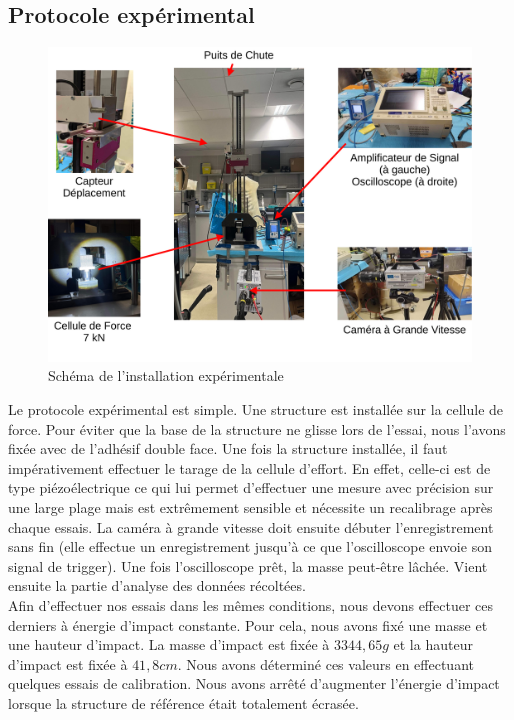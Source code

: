 \documentclass[a4paper]{article}
\begin{document}
	\subsection{Protocole expérimental}	
	\begin{figure}[H]
		\centering
		\includegraphics[width=15cm]{Images/6/protocole.pdf}
		\caption{Schéma de l'installation expérimentale}
	\end{figure}

	\hspace{0.5cm}Le protocole expérimental est simple. Une structure est installée sur la cellule de force. Pour éviter que la base de la structure ne glisse lors de l'essai, nous l'avons fixée avec de l'adhésif double face. Une fois la structure installée, il faut impérativement effectuer le tarage de la cellule d'effort. En effet, celle-ci est de type piézoélectrique ce qui lui permet d'effectuer une mesure avec précision sur une large plage mais est extrêmement sensible et nécessite un recalibrage après chaque essais. La caméra à grande vitesse doit ensuite débuter l'enregistrement sans fin (elle effectue un enregistrement jusqu'à ce que l'oscilloscope envoie son signal de trigger). Une fois l'oscilloscope prêt, la masse peut-être lâchée. Vient ensuite la partie d'analyse des données récoltées.\\
	
	Afin d'effectuer nos essais dans les mêmes conditions, nous devons effectuer ces derniers à énergie d'impact constante. Pour cela, nous avons fixé une masse et une hauteur d'impact. La masse d'impact est fixée à $3344,65 g$ et la hauteur d'impact est fixée à $41,8 cm$. Nous avons déterminé ces valeurs en effectuant quelques essais de calibration. Nous avons arrêté d'augmenter l'énergie d'impact lorsque la structure de référence était totalement écrasée.\\
	
\end{document}
